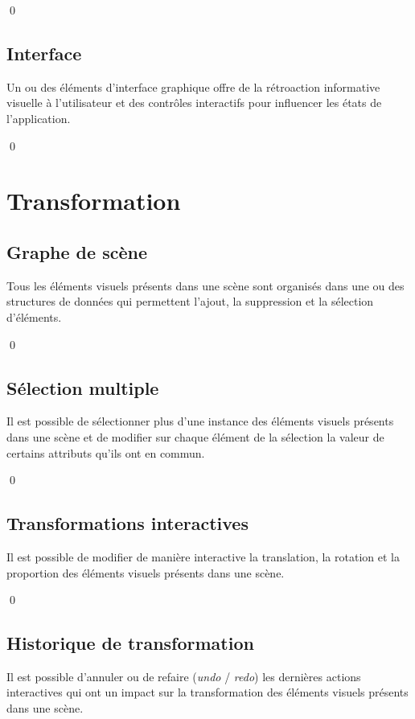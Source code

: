 \documentclass[12pt]{article}
\newcommand{\state}{\noindent}
\begin{document}
\qed

\subsection{Interface}

\state
Un ou des éléments d'interface graphique offre de la rétroaction informative visuelle à l'utilisateur et des contrôles interactifs pour influencer les états de l'application.

\qed

\pagebreak

\section{Transformation}

\subsection{Graphe de scène}

\state
Tous les éléments visuels présents dans une scène sont organisés dans une ou des structures de données qui permettent l'ajout, la suppression et la sélection d'éléments.

\qed

\subsection{Sélection multiple}

\state
Il est possible de sélectionner plus d'une instance des éléments visuels
présents dans une scène et de modifier sur chaque élément de la sélection la valeur de certains attributs qu'ils ont en commun.

\qed

\subsection{Transformations interactives}

\state
Il est possible de modifier de manière interactive la translation, la rotation
et la proportion des éléments visuels présents dans une scène.

\qed


\subsection{Historique de transformation}

\state
Il est possible d'annuler ou de refaire (\textit{undo} / \textit{redo}) les dernières actions interactives qui ont un impact sur la transformation des éléments visuels présents dans une scène.
\end{document}
